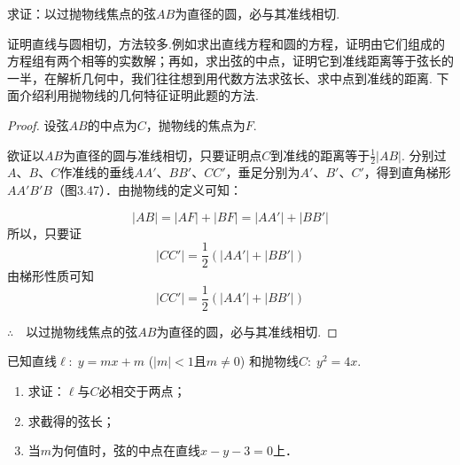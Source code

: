 \begin{example}
    求证：以过抛物线焦点的弦$AB$为直径的圆，必与其准线相切.
\end{example}

\begin{analyze}
    证明直线与圆相切，方法较多.例如求出直线方程和圆的方程，证明由它们组成的方程组有两个相等的实数解；再如，求出弦的中点，证明它到准线距离等于弦长的一半，在解析几何中，我们往往想到用代数方法求弦长、求中点到准线的距离. 下面介绍利用抛物线的几何特征证明此题的方法.
\end{analyze}

\begin{proof}
设弦$AB$的中点为$C$，抛物线的焦点为$F$.

欲证以$AB$为直径的圆与准线相切，只要证明点$C$到准线的距离等于$\frac{1}{2}|AB|$. 分别过$A$、$B$、$C$作准线的垂线$AA'$、$BB'$、$CC'$，垂足分别为$A'$、$B'$、$C'$，得到直角梯形$AA'B'B$（图3.47）．由抛物线的定义可知：

\noindent
\begin{minipage}{.53\textwidth}

\[|AB|=|AF|+|BF|=|AA'|+|BB'|\]
所以，只要证
\[|CC'|=\frac{1}{2}(|AA'|+|BB'|)\]
由梯形性质可知
\[|CC'|=\frac{1}{2}(|AA'|+|BB'|)\]

$\therefore\quad$以过抛物线焦点的弦$AB$为直径的圆，必与其准线相切.
\end{minipage}
\hfill
\begin{minipage}{.45\textwidth}
\centering
{}
\end{minipage}
\end{proof}

\begin{example}
已知直线$\ell:\; y=mx+m$ ($|m|<1$且$m\ne 0$) 和抛物线$C:\; y^2=4x$.
\begin{enumerate}[(1)]
\item 求证：$\ell$与$C$必相交于两点；
\item 求截得的弦长；
\item 当$m$为何值时，弦的中点在直线$x-y-3=0$上．
\end{enumerate}
\end{example}

